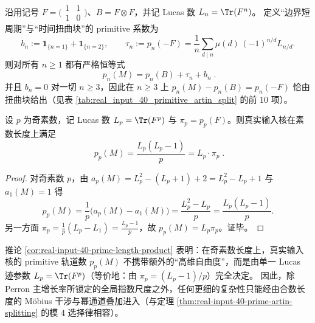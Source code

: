 \begin{corollary}\label{cor:real-input-40-space-twist-boundary-split}
沿用记号 \(F=\bigl(\begin{smallmatrix}1&1\\[2pt]1&0\end{smallmatrix}\bigr)\)、\(B=F\otimes F\)，并记 Lucas 数 \(L_n=\Tr(F^n)\)。
定义“边界短周期”与“时间扭曲块”的 primitive 系数为
\[
b_n:=\mathbf{1}_{\{n=1\}}+\mathbf{1}_{\{n=2\}},
\qquad
\tau_n:=p_n(-F)=\frac{1}{n}\sum_{d\mid n}\mu(d)\,(-1)^{n/d}L_{n/d}.
\]
则对所有 \(n\ge 1\) 都有严格恒等式
\[
\boxed{\; p_n(M)=p_n(B)+\tau_n+b_n\; }.
\]
并且 \(b_n=0\) 对一切 \(n\ge 3\)，因此在 \(n\ge 3\) 上
\(
p_n(M)-p_n(B)=p_n(-F)
\)
恰由扭曲块给出（见表 \ref{tab:real_input_40_primitive_artin_split} 的前 \(10\) 项）。
\end{corollary}

\begin{corollary}\label{cor:real-input-40-prime-length-product}
设 \(p\) 为奇素数，记 Lucas 数 \(L_p=\Tr(F^p)\) 与 \(\pi_p=p_p(F)\)。则真实输入核在素数长度上满足
\[
\boxed{\;
p_p(M)=\frac{L_p(L_p-1)}{p}=L_p\cdot \pi_p\; }.
\]
\end{corollary}
\begin{proof}
对奇素数 \(p\)，由 \(a_p(M)=L_p^2- (L_p+1)+2=L_p^2-L_p+1\) 与 \(a_1(M)=1\) 得
\[
p_p(M)=\frac{1}{p}\bigl(a_p(M)-a_1(M)\bigr)=\frac{L_p^2-L_p}{p}=\frac{L_p(L_p-1)}{p}.
\]
另一方面 \(\pi_p=\frac{1}{p}(L_p-L_1)=\frac{L_p-1}{p}\)，故 \(p_p(M)=L_p\pi_p\)。证毕。
\end{proof}

\begin{remark}[素数长度的局部一维化]\label{rem:real-input-40-prime-local-1d}
推论 \ref{cor:real-input-40-prime-length-product} 表明：在奇素数长度上，真实输入核的 primitive 轨道数
\(
p_p(M)
\)
不携带额外的“高维自由度”，而是由单一 Lucas 迹参数 \(L_p=\Tr(F^p)\)（等价地：由 \(\pi_p=(L_p-1)/p\)）完全决定。
因此，除 Perron 主增长率所锁定的全局指数尺度之外，任何更细的复杂性只能经由合数长度的 Möbius 干涉与幂通道叠加进入（与定理 \ref{thm:real-input-40-prime-artin-splitting} 的模 \(4\) 选择律相容）。
\end{remark}

